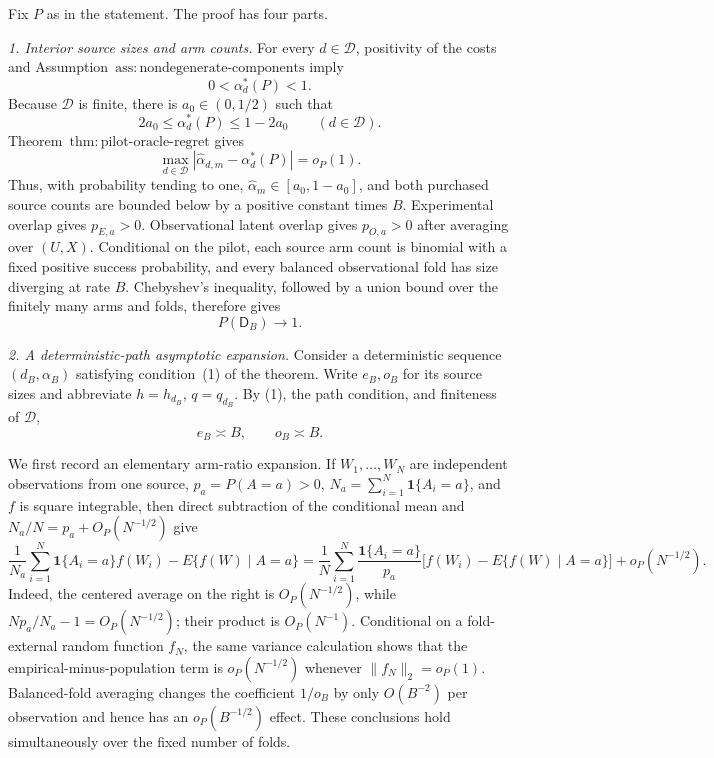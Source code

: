 Fix \(P\) as in the statement.  The proof has four parts.

\emph{1. Interior source sizes and arm counts.}
For every \(d\in\mathcal D\), positivity of the costs and Assumption~\(\mathrm{ass{:}nondegenerate\text{-}components}\) imply
\[
 0<\alpha_d^*(P)<1.
\]
Because \(\mathcal D\) is finite, there is \(a_0\in(0,1/2)\) such that
\[
 2a_0\le \alpha_d^*(P)\le1-2a_0
 \qquad(d\in\mathcal D). \tag{1}
\]
Theorem~\(\mathrm{thm{:}pilot\text{-}oracle\text{-}regret}\) gives
\[
 \max_{d\in\mathcal D}
 |\widehat\alpha_{d,m}-\alpha_d^*(P)|=o_P(1). \tag{2}
\]
Thus, with probability tending to one, \(\widehat\alpha_m\in[a_0,1-a_0]\), and both purchased source counts are bounded below by a positive constant times \(B\).  Experimental overlap gives \(p_{E,a}>0\).  Observational latent overlap gives \(p_{O,a}>0\) after averaging over \((U,X)\).  Conditional on the pilot, each source arm count is binomial with a fixed positive success probability, and every balanced observational fold has size diverging at rate \(B\).  Chebyshev's inequality, followed by a union bound over the finitely many arms and folds, therefore gives
\[
 P(\mathsf D_B)\longrightarrow1. \tag{3}
\]

\emph{2. A deterministic-path asymptotic expansion.}
Consider a deterministic sequence \((d_B,\alpha_B)\) satisfying condition~(1) of the theorem.  Write \(e_B,o_B\) for its source sizes and abbreviate \(h=h_{d_B}\), \(q=q_{d_B}\).  By (1), the path condition, and finiteness of \(\mathcal D\),
\[
 e_B\asymp B,\qquad o_B\asymp B. \tag{4}
\]

We first record an elementary arm-ratio expansion.  If \(W_1,\ldots,W_N\) are independent observations from one source, \(p_a=P(A=a)>0\), \(N_a=\sum_{i=1}^N\mathbf 1\{A_i=a\}\), and \(f\) is square integrable, then direct subtraction of the conditional mean and \(N_a/N=p_a+O_P(N^{-1/2})\) give
\[
 \frac{1}{N_a}\sum_{i=1}^N\mathbf 1\{A_i=a\}f(W_i)
 -E\{f(W)\mid A=a\}
 =\frac1N\sum_{i=1}^N\frac{\mathbf 1\{A_i=a\}}{p_a}
 \bigl[f(W_i)-E\{f(W)\mid A=a\}\bigr]
 +o_P(N^{-1/2}). \tag{5}
\]
Indeed, the centered average on the right is \(O_P(N^{-1/2})\), while \(Np_a/N_a-1=O_P(N^{-1/2})\); their product is \(O_P(N^{-1})\).  Conditional on a fold-external random function \(f_N\), the same variance calculation shows that the empirical-minus-population term is \(o_P(N^{-1/2})\) whenever \(\|f_N\|_2=o_P(1)\).  Balanced-fold averaging changes the coefficient \(1/o_B\) by only \(O(B^{-2})\) per observation and hence has an \(o_P(B^{-1/2})\) effect.  These conclusions hold simultaneously over the fixed number of folds.


